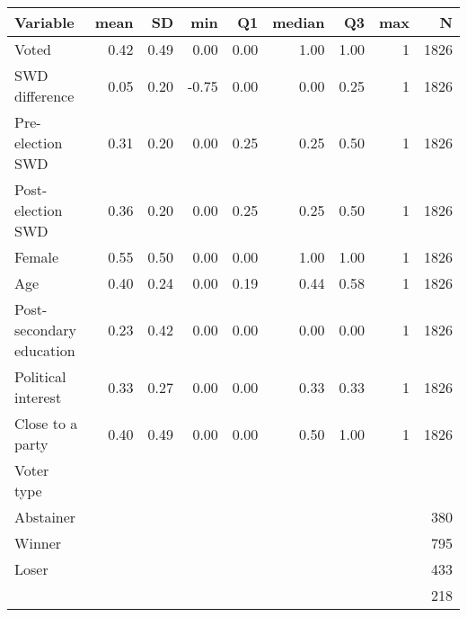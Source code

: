 
\begin{tabular}{l|r|r|r|r|r|r|r|r}
\hline
Variable & mean & SD & min & Q1 & median & Q3 & max & N\\
\hline
Voted & 0.42 & 0.49 & 0.00 & 0.00 & 1.00 & 1.00 & 1 & 1826\\
\hline
SWD difference & 0.05 & 0.20 & -0.75 & 0.00 & 0.00 & 0.25 & 1 & 1826\\
\hline
Pre-election SWD & 0.31 & 0.20 & 0.00 & 0.25 & 0.25 & 0.50 & 1 & 1826\\
\hline
Post-election SWD & 0.36 & 0.20 & 0.00 & 0.25 & 0.25 & 0.50 & 1 & 1826\\
\hline
Female & 0.55 & 0.50 & 0.00 & 0.00 & 1.00 & 1.00 & 1 & 1826\\
\hline
Age & 0.40 & 0.24 & 0.00 & 0.19 & 0.44 & 0.58 & 1 & 1826\\
\hline
Post-secondary education & 0.23 & 0.42 & 0.00 & 0.00 & 0.00 & 0.00 & 1 & 1826\\
\hline
Political interest & 0.33 & 0.27 & 0.00 & 0.00 & 0.33 & 0.33 & 1 & 1826\\
\hline
Close to a party & 0.40 & 0.49 & 0.00 & 0.00 & 0.50 & 1.00 & 1 & 1826\\
\hline
Voter type &  &  &  &  &  &  &  & \\
\hline
Abstainer &  &  &  &  &  &  &  & 380\\
\hline
Winner &  &  &  &  &  &  &  & 795\\
\hline
Loser &  &  &  &  &  &  &  & 433\\
\hline
 &  &  &  &  &  &  &  & 218\\
\hline
\end{tabular}
